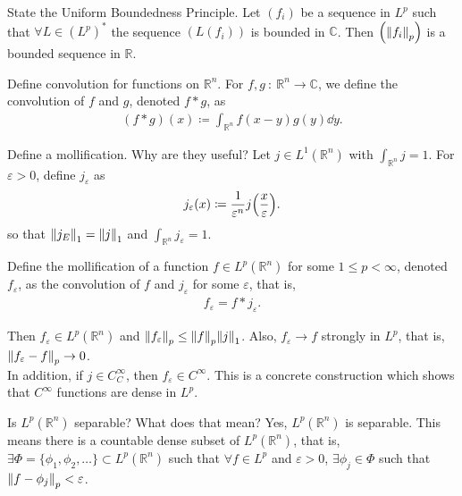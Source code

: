 \documentclass[avery5388,grid,frame]{flashcards}
\newcommand{\E}{\varepsilon}
\newcommand{\f}[3]{#1\ :\ #2 \rightarrow #3}
\def\Rl{\mathbb{R}}
\def\Cx{\mathbb{C}}
\begin{document}
\begin{flashcard}
    {State the Uniform Boundedness Principle.}
    Let $(f_i)$ be a sequence in $L^p$ such that $\forall L \in (L^p)^*$ the sequence $(L(f_i))$ is bounded in $\Cx$.  Then $\qty(\norm{f_i}_p)$ is a bounded sequence in $\Rl$.
\end{flashcard}

\begin{flashcard}
    {Define convolution for functions on $\Rl^n$.}
    For $\f{f,g}{\Rl^n}{\Cx}$, we define the convolution of $f$ and $g$, denoted $f * g$, as
    \begin{align*}
        (f*g)(x) \coloneqq \int_{\Rl^n} f(x - y)g(y)\dd y.
    \end{align*}
\end{flashcard}

\begin{flashcard}
    {Define a mollification.  Why are they useful?}
    Let $j \in L^1(\Rl^n)$ with $\int_{\Rl^n}j = 1$.  For $\E > 0$, define $j_\E$ as
    \begin{align*}
        j_\E(x) \coloneqq \frac{1}{\E^n}j\qty(\frac{x}{\E}).
    \end{align*}
    so that $\norm{j_E}_1 = \norm{j}_1$ and $\int_{\Rl^n}j_\E = 1$.

    Define the mollification of a function $f \in L^p(\Rl^n)$ for some $1 \leq p < \infty$, denoted $f_\E$, as the convolution of $f$ and $j_\E$ for some $\E$, that is,
    \begin{align*}
        f_\E = f * j_\E.
    \end{align*}

    Then $f_\E \in L^p(\Rl^n)$ and $\norm{f_\E}_p \leq \norm{f}_p\norm{j}_1$.  Also, $f_\E \rightarrow f$ strongly in $L^p$, that is, $\norm{f_\E - f}_p \rightarrow 0$. \\

    In addition, if $j \in C_C^\infty$, then $f_\E \in C^\infty$.  This is a concrete construction which shows that $C^\infty$ functions are dense in $L^p$.
\end{flashcard}

\begin{flashcard}
    {Is $L^p(\Rl^n)$ separable?  What does that mean?}
    Yes, $L^p(\Rl^n)$ is separable.  This means there is a countable dense subset of $L^p(\Rl^n)$, that is, $\exists \Phi = \{\phi_1,\phi_2,\dots\} \subset L^p(\Rl^n)$ such that $\forall f \in L^p$ and $\E > 0$, $\exists \phi_j \in \Phi$ such that $\norm{f - \phi_j}_p < \E$.
\end{flashcard}
\end{document}
